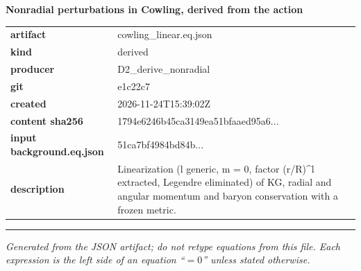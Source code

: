 \documentclass[10pt,a4paper]{article}
\begin{document}
{\Large\bfseries Nonradial perturbations in Cowling, derived from the action}\par
\smallskip
\begin{tabular}{@{}lp{}@{}}\textbf{artifact} & cowling\_linear.eq.json\\\textbf{kind} & derived\\\textbf{producer} & D2\_derive\_nonradial\\\textbf{git} & e1c22c7\\\textbf{created} & 2026-11-24T15:39:02Z\\\textbf{content sha256} & 1794e6246b45ca3149ea51bfaaed95a6...\\\textbf{input background.eq.json} & 51ca7bf4984bd84b...\\\textbf{description} & Linearization (l generic, m = 0, factor (r/R)\textasciicircum{}l extracted, Legendre eliminated) of KG, radial and angular momentum and baryon conservation with a frozen metric.\\\end{tabular}
\par\medskip\hrule\medskip

\textit{Generated from the JSON artifact; do not retype equations from this file. Each expression is the left side of an equation ``$= 0$'' unless stated otherwise.}\par
\end{document}
